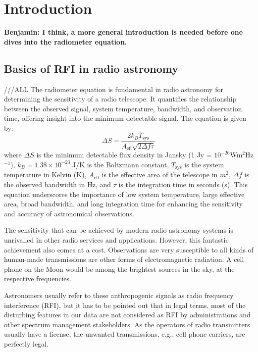 \section{Introduction}
\label{section:hardware: introduction}

\textbf{Benjamin: I think, a more general introduction is needed before one dives into the radiometer equation.}

\subsection{Basics of RFI in radio astronomy} ///ALL
The radiometer equation is fundamental in radio astronomy for determining the sensitivity of a radio telescope. It quantifies the relationship between the observed signal, system temperature, bandwidth, and observation time, offering insight into the minimum detectable signal. The equation is given by:
\[ \Delta S = \frac{2 k_B T_{\text{sys}}}{A_{\text{eff}} \sqrt{2 \Delta f \tau}} \]
where \( \Delta S \) is the minimum detectable flux density in Jansky (1 Jy = $10^{-26}$Wm$^2$Hz$^{-1}$), \( k_B =1.38 \times 10^{-23} \;\text{J} / \text{K}\) is the Boltzmann constant, \( T_{\text{sys}} \) is the system temperature in Kelvin (K), \( A_{\text{eff}} \) is the effective area of the telescope in $m^2$, \( \Delta f \) is the observed bandwidth in Hz, and \( \tau \) is the integration time in seconds (s). This equation underscores the importance of low system temperature, large effective area, broad bandwidth, and long integration time for enhancing the sensitivity and accuracy of astronomical observations.

The sensitivity that can be achieved by modern radio astronomy systems is unrivalled in other radio services and applications. However, this fantastic achievement also comes at a cost. Observations are very susceptible to all kinds of human-made transmissions are other forms of electromagnetic radiation. A cell phone on the Moon would be among the brightest sources in the sky, at the respective frequencies. 

Astronomers usually refer to these anthropogenic signals as radio frequency interference (RFI), but it has to be pointed out that in legal terms, most of the disturbing features in our data are not considered as RFI by administrations and other spectrum management stakeholders. As the operators of radio transmitters usually have a license, the unwanted transmissions, e.g., cell phone carriers, are perfectly legal. 

